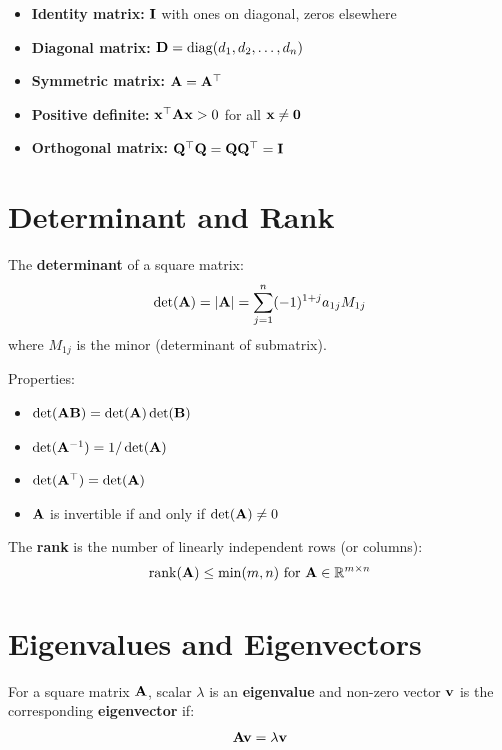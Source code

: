 \begin{itemize}
    \item \textbf{Identity matrix:} $\mathbf{I}$ with ones on diagonal, zeros elsewhere
    \item \textbf{Diagonal matrix:} $\mathbf{D} = \operatorname{diag}(d_1, d_2, \ldots, d_n)$
    \item \textbf{Symmetric matrix:} $\mathbf{A} = \mathbf{A}^\top$
    \item \textbf{Positive definite:} $\mathbf{x}^\top\mathbf{A}\mathbf{x} > 0$ for all $\mathbf{x} \neq \mathbf{0}$
    \item \textbf{Orthogonal matrix:} $\mathbf{Q}^\top\mathbf{Q} = \mathbf{Q}\mathbf{Q}^\top = \mathbf{I}$
\end{itemize}

\section{Determinant and Rank}

The \textbf{determinant} of a square matrix:
\begin{equation}
\det(\mathbf{A}) = |\mathbf{A}| = \sum_{j=1}^n (-1)^{1+j} a_{1j} M_{1j}
\end{equation}
where $M_{1j}$ is the minor (determinant of submatrix).

Properties:
\begin{itemize}
    \item $\det(\mathbf{A}\mathbf{B}) = \det(\mathbf{A})\det(\mathbf{B})$
    \item $\det(\mathbf{A}^{-1}) = 1/\det(\mathbf{A})$
    \item $\det(\mathbf{A}^\top) = \det(\mathbf{A})$
    \item $\mathbf{A}$ is invertible if and only if $\det(\mathbf{A}) \neq 0$
\end{itemize}

The \textbf{rank} is the number of linearly independent rows (or columns):
\begin{equation}
\operatorname{rank}(\mathbf{A}) \leq \min(m, n) \text{ for } \mathbf{A} \in \mathbb{R}^{m \times n}
\end{equation}

\section{Eigenvalues and Eigenvectors}

\begin{definitionbox}[title=Definition 0.5: Eigenvalue Problem]
For a square matrix $\mathbf{A}$, scalar $\lambda$ is an \textbf{eigenvalue} and non-zero vector $\mathbf{v}$ is the corresponding \textbf{eigenvector} if:
\begin{equation}
\mathbf{A}\mathbf{v} = \lambda\mathbf{v}
\end{equation}
\end{definitionbox}

